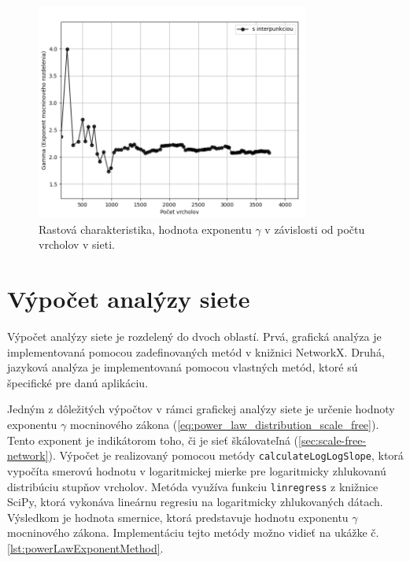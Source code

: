 \begin{figure}
    \centerline{\includegraphics[width=0.8\textwidth]{images/growthPlot.png}}
    \caption[Rastová charakteristika, hodnota exponentu $\gamma$ v závislosti od počtu vrcholov v sieti.]{Rastová charakteristika, hodnota exponentu $\gamma$ v závislosti od počtu vrcholov v sieti.}
    \label{obr:growthPlot}
\end{figure}

\section{Výpočet analýzy siete}\label{sec:calculationOfNetworkAnalysis}

Výpočet analýzy siete je rozdelený do dvoch oblastí. Prvá, grafická analýza je implementovaná pomocou zadefinovaných
metód v knižnici NetworkX. Druhá, jazyková analýza je implementovaná pomocou vlastných metód,
ktoré sú špecifické pre danú aplikáciu.

Jedným z dôležitých výpočtov v rámci grafickej analýzy siete je určenie hodnoty exponentu $\gamma$ mocninového zákona (\ref{eq:power_law_distribution_scale_free}).
Tento exponent je indikátorom toho, či je sieť škálovateľná (\ref{sec:scale-free-network}).
Výpočet je realizovaný pomocou metódy \texttt{calculateLogLogSlope}, ktorá vypočíta smerovú hodnotu v logaritmickej mierke pre logaritmicky zhlukovanú distribúciu stupňov vrcholov.
Metóda využíva funkciu \texttt{linregress} z knižnice SciPy, ktorá vykonáva lineárnu regresiu na logaritmicky zhlukovaných dátach.
Výsledkom je hodnota smernice, ktorá predstavuje hodnotu exponentu $\gamma$ mocninového zákona. Implementáciu tejto metódy možno vidieť na ukážke č. \ref{lst:powerLawExponentMethod}.

